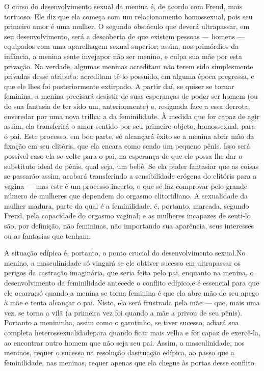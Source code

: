  O curso do desenvolvimento sexual da menina é, de acordo com Freud,
mais tortuoso. Ele diz que ela começa com um relacionamento
homossexual, pois seu primeiro amor é uma mulher. O segundo obstáculo
que deverá ultrapassar, em seu desenvolvimento, será a descoberta de
que existem pessoas --- homens --- equipados com uma aparelhagem sexual
superior; assim, nos primórdios da infância, a menina sente inveja\idxinvej[|(] por
não ser menino, e culpa sua mãe\idxmaesconf{} por esta privação. Na verdade, algumas
meninas acreditam não terem sido simplesmente privadas desse atributo:
acreditam tê-lo possuído, em alguma época pregressa, e que ele lhes foi
posteriormente extirpado. A partir daí, se quiser se tornar feminina, a
menina precisará desistir de suas esperanças de poder ser homem (ou de
sua fantasia de ter sido um, anteriormente) e, resignada face a essa
derrota, enveredar por uma nova trilha: a da feminilidade. À medida que
for capaz de agir assim, ela transferirá o amor sentido por seu
primeiro objeto, homossexual, para o pai. Este processo, em boa parte,
só alcançará êxito se a menina abrir mão da fixação em seu clitóris,\idxfeminfixa{}
que ela encara como sendo um pequeno pênis. Isso será possível caso ela
se volte para o pai, na esperança de que ele possa lhe dar o substituto
ideal do pênis, qual seja, um bebê. Se ela puder fantasiar que as
coisas se passarão assim, acabará transferindo a sensibilidade erógena
do clitóris\idxclitfemi{} para a vagina --- mas este é um processo incerto, o que se
faz comprovar pelo grande número de mulheres que dependem do\idxvaginorg{} orgasmo\idxorgascli{}
clitoridiano. A sexualidade da mulher madura, parte da qual é a
feminilidade, é, portanto, marcada, segundo Freud, pela capacidade do
orgasmo vaginal; e as mulheres incapazes de senti-lo são, por
definição, não femininas, não importando sua aparência, seus interesses
ou as fantasias que tenham.

 A situação edípica é, portanto, o ponto crucial do desenvolvimento
sexual.\idxrelpciden[|(] No menino, a masculinidade só vingará se ele obtiver sucesso em
ultrapassar os perigos da castração imaginária, que seria feita pelo
pai, enquanto na menina, o desenvolvimento da feminilidade antecede o
conflito edípico,\idxfeminconf[|(] e é essencial para que ele ocorra;\idxcastaconf[|)] só quando a menina
se torna feminina é que ela abre mão de seu apego à mãe e tenta
alcançar o pai. Nisto, ela será frustrada pela mãe --- que, mais uma
vez, se torna a vilã (a primeira vez foi quando a mãe a privou de seu
pênis). Portanto a menininha, assim como o garotinho, se tiver sucesso,
adiará sua completa heterossexualidade\idxconfehete[|(] para quando ficar mais velha e
for capaz de exercê-la, ao encontrar outro homem que não seja seu pai.
Assim, a masculinidade, nos meninos, requer o sucesso na resolução da\idxinvej[|)]
situação edípica, ao passo que a feminilidade, nas meninas, requer\idxconfemeni{}
apenas que ela chegue às portas desse conflito.

